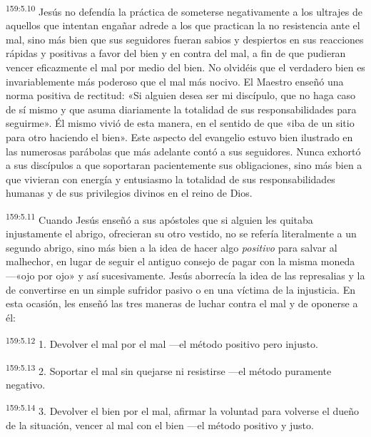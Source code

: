 \par 
\textsuperscript{159:5.10} Jesús no defendía la práctica de someterse negativamente a los ultrajes de aquellos que intentan engañar adrede a los que practican la no resistencia ante el mal, sino más bien que sus seguidores fueran sabios y despiertos en sus reacciones rápidas y positivas a favor del bien y en contra del mal, a fin de que pudieran vencer eficazmente el mal por medio del bien. No olvidéis que el verdadero bien es invariablemente más poderoso que el mal más nocivo. El Maestro enseñó una norma positiva de rectitud: «Si alguien desea ser mi discípulo, que no haga caso de sí mismo y que asuma diariamente la totalidad de sus responsabilidades para seguirme». Él mismo vivió de esta manera, en el sentido de que «iba de un sitio para otro haciendo el bien». Este aspecto del evangelio estuvo bien ilustrado en las numerosas parábolas que más adelante contó a sus seguidores. Nunca exhortó a sus discípulos a que soportaran pacientemente sus obligaciones, sino más bien a que vivieran con energía y entusiasmo la totalidad de sus responsabilidades humanas y de sus privilegios divinos en el reino de Dios.

\par 
\textsuperscript{159:5.11} Cuando Jesús enseñó a sus apóstoles que si alguien les quitaba injustamente el abrigo, ofrecieran su otro vestido, no se refería literalmente a un segundo abrigo, sino más bien a la idea de hacer algo \textit{positivo} para salvar al malhechor, en lugar de seguir el antiguo consejo de pagar con la misma moneda ---«ojo por ojo» y así sucesivamente. Jesús aborrecía la idea de las represalias y la de convertirse en un simple sufridor pasivo o en una víctima de la injusticia. En esta ocasión, les enseñó las tres maneras de luchar contra el mal y de oponerse a él:

\par 
\textsuperscript{159:5.12} 1. Devolver el mal por el mal ---el método positivo pero injusto.

\par 
\textsuperscript{159:5.13} 2. Soportar el mal sin quejarse ni resistirse ---el método puramente negativo.

\par 
\textsuperscript{159:5.14} 3. Devolver el bien por el mal, afirmar la voluntad para volverse el dueño de la situación, vencer al mal con el bien ---el método positivo y justo.

